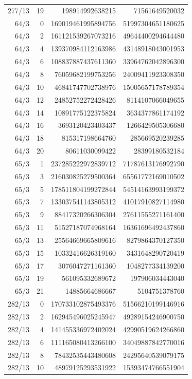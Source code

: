 \begin{longtable}{@{}rrrr@{}}
277/13 & 19 & 198914992638215 & 71561649520032\\
64/3 & 0 & 169019461995894756 & 51997304651180625\\
64/3 & 2 & 161121539267073216 & 49644400294644480\\
64/3 & 4 & 139370984112163986 & 43148918043001953\\
64/3 & 6 & 108837887437611360 & 33964762042896300\\
64/3 & 8 & 76059682199753256 & 24009411923308350\\
64/3 & 10 & 46841747702738976 & 15005657178789354\\
64/3 & 12 & 24852752272428426 & 8114107066049655\\
64/3 & 14 & 10891775122375824 & 3634377861174192\\
64/3 & 16 & 3693120423403437 & 1266429505306680\\
64/3 & 18 & 815317198664760 & 285669520239285\\
64/3 & 20 & 80611030099422 & 28399180532184\\
65/3 & 1 & 237285222972839712 & 71787613176992790\\
65/3 & 3 & 216030825279500364 & 65561772169010502\\
65/3 & 5 & 178511804199272844 & 54514163993199372\\
65/3 & 7 & 133037541143805312 & 41017910827114980\\
65/3 & 9 & 88417320266306304 & 27611555271161400\\
65/3 & 11 & 51527187074968164 & 16361696492437860\\
65/3 & 13 & 25564669665809616 & 8279864370127350\\
65/3 & 15 & 10332416626319160 & 3431648290720419\\
65/3 & 17 & 3076047271161360 & 1048277334139200\\
65/3 & 19 & 561095332689672 & 197906034443040\\
65/3 & 21 & 14885664686667 & 5104751378760\\
282/13 & 0 & 170733102875493376 & 51566210199146916\\
282/13 & 2 & 162945496025245947 & 49289154246900750\\
282/13 & 4 & 141455336972402024 & 42990519624266860\\
282/13 & 6 & 111165080413266100 & 34049887842770016\\
282/13 & 8 & 78432535443480608 & 24295640539079175\\
282/13 & 10 & 48979125293531922 & 15393474766551904\\

\end{longtable}
